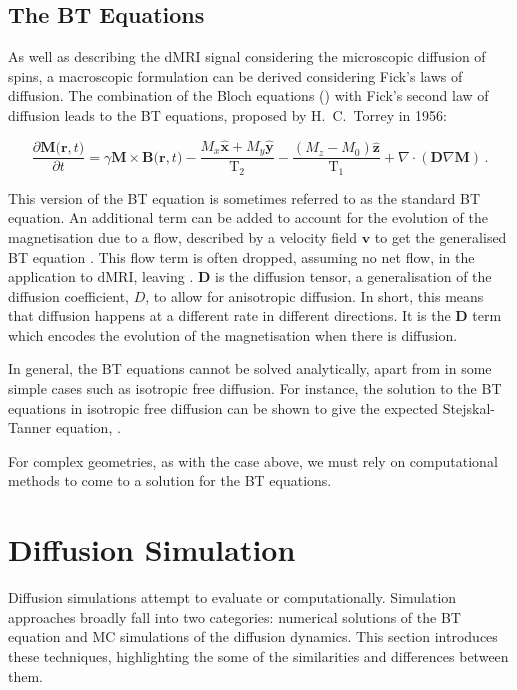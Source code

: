 \subsection{The \acl{BT} Equations}
\label{sec:bg_bloch_torrey}
As well as describing the \ac{dMRI} signal considering the microscopic diffusion of spins, a macroscopic formulation can be derived considering Fick's laws of diffusion. The combination of the Bloch equations () with Fick's second law of diffusion leads to the \ac{BT} equations, proposed by H.\ C.\ Torrey in 1956\cite{Torrey1956,Callaghan1991,Price2009}:

\begin{equation}
  \frac{\partial\mathbf{M(r},t)}{\partial t} = \gamma \mathbf{M \times B(r}, t) - \frac{M_x\mathbf{\hat{x}} + M_y\mathbf{\hat{y}}}{\mathrm{T}_2} - \frac{(M_z - M_0)\mathbf{\hat{z}}}{\mathrm{T}_1} + \nabla \cdot \left(\mathbf{D} \nabla \mathbf{M}\right)\,.
  \label{eq:bloch_torrey}
\end{equation}

This version of the \ac{BT} equation is sometimes referred to as the standard \ac{BT} equation. An additional term can be added to account for the evolution of the magnetisation due to a flow, described by a velocity field $\mathbf{v}$ to get the generalised \ac{BT} equation \cite{Jeener2002}. This flow term is often dropped, assuming no net flow, in the application to \ac{dMRI}, leaving . 
$\mathbf{D}$ is the diffusion tensor, a generalisation of the diffusion coefficient, $D$, to allow for anisotropic diffusion. In short, this means that diffusion happens at a different rate in different directions.
It is the $\mathbf{D}$ term which encodes the evolution of the magnetisation when there is diffusion.

In general, the \ac{BT} equations cannot be solved analytically, apart from in some simple cases such as isotropic free diffusion.
For instance, the solution to the \ac{BT} equations in isotropic free diffusion can be shown to give the expected Stejskal-Tanner equation, .

For complex geometries, as with the case above, we must rely on computational methods to come to a solution for the \ac{BT} equations. 



\section{Diffusion Simulation}
\label{sec:diffusion_simulation}
Diffusion simulations attempt to evaluate  or  computationally. Simulation approaches broadly fall into two categories: numerical solutions of the \ac{BT} equation and \ac{MC} simulations of the diffusion dynamics. This section introduces these techniques, highlighting the some of the similarities and differences between them. 



